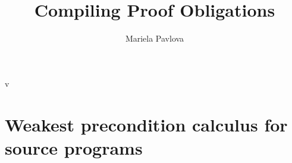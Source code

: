 \documentclass[a4paper]{article}
\title{Compiling Proof Obligations }
\author{Mariela Pavlova}
\begin{document}
\maketitle
\tableofcontents
\newpage 
   
v
   
   
   
	 

   
	  
	 
	 

   
   \section{Weakest precondition calculus for source programs}
    
   	  
   
   
   
   
  
    


\end{document}
